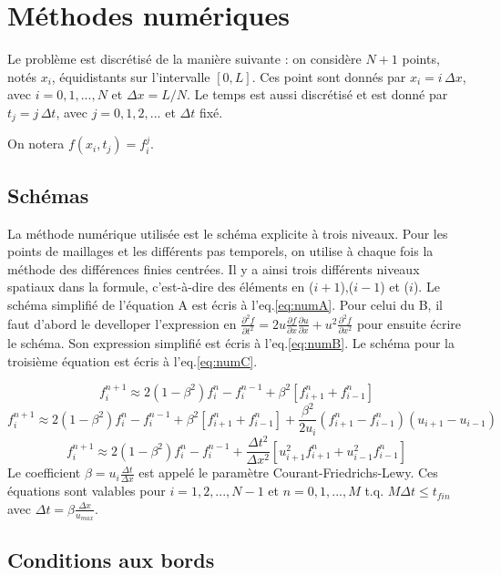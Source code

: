 \documentclass[a4paper,12pt,oneside]{article}
\def \be {\begin{equation}}
\def \ee {\end{equation}}
\def \dx  {\Delta x}
\def \dt  {\Delta t}
\begin{document}
\section{Méthodes numériques}
Le problème est discrétisé de la manière suivante : on considère $N+1$ points, notés $x_i$, équidistants sur l'intervalle $[0,L]$. Ces point sont donnés par $x_i=i \, \dx$, avec $i=0,1,...,N$ et $\dx=L/N$. Le temps est aussi discrétisé et est donné par $t_j=j \, \dt$, avec $j=0,1,2,...$ et $\dt$ fixé. 

On notera $f(x_i,t_j)=f_i^j$.


\subsection{Schémas}
La méthode numérique utilisée est le schéma explicite à trois niveaux. Pour les points de maillages et les différents pas temporels, on utilise à chaque fois la méthode des différences finies centrées.  Il y a ainsi trois différents niveaux spatiaux dans la formule, c'est-à-dire des éléments en ($i+1$),($i-1$) et ($i$). Le schéma simplifié de l'équation A est écris à l'eq.\eqref{eq:numA}. Pour celui du B, il faut d'abord  le develloper l'expression en $\frac{\partial^2 f}{\partial t^2}=2u\frac{\partial f}{\partial x}\frac{\partial u}{\partial x}+u^2\frac{\partial^2f}{\partial x^2}$ pour ensuite écrire le schéma. Son expression simplifié est écris à l'eq.\eqref{eq:numB}.
Le schéma pour la troisième équation est écris à l'eq.\eqref{eq:numC}.

\be
f_i^{n+1}\approx 2(1-\beta^2)f_i^n-f_i^{n-1}+\beta^2[f_{i+1}^n+f_{i-1}^n] 
\label{eq:numA}
\ee
\be
f_i^{n+1}\approx 2(1-\beta^2)f_i^n-f_i^{n-1}+\beta^2[f_{i+1}^n+f_{i-1}^n] +\frac{\beta^2}{2u_i}(f_{i+1}^n-f_{i-1}^n)(u_{i+1}-u_{i-1})
\label{eq:numB}
\ee
\be
f_i^{n+1}\approx 2(1-\beta^2)f_i^n-f_i^{n-1}+\frac{\Delta t^2}{\Delta x^2}[u_{i+1}^2 f_{i+1}^n+u_{i-1}^2f_{i-1}^n] 
\label{eq:numC}
\ee
Le coefficient $\beta=u_i\frac{\Delta t}{\Delta x}$ est appelé le paramètre Courant-Friedrichs-Lewy. Ces équations sont valables pour $i=1,2,...,N-1$ et $n=0,1,...,M$ t.q. $M\Delta t\leq t_{fin}$ avec $\Delta t=\beta \frac{\Delta x}{u_{max}}$. 

\subsection{Conditions aux bords}
\end{document}
